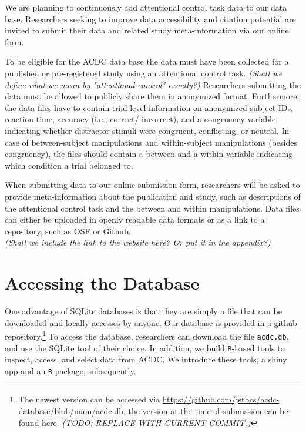 \documentclass[
  man,floatsintext]{apa6}
\begin{document}
We are planning to continuously add attentional control task data to our data base. Researchers seeking to improve data accessibility and citation potential are invited to submit their data and related study meta-information via our online form.

To be eligible for the ACDC data base the data must have been collected for a published or pre-registered study using an attentional control task. \emph{ (Shall we define what we mean by "attentional control" exactly?)} Researchers submitting the data must be allowed to publicly share them in anonymized format. Furthermore, the data files have to contain trial-level information on anonymized subject IDs, reaction time, accuracy (i.e., correct/ incorrect), and a congruency variable, indicating whether distractor stimuli were congruent, conflicting, or neutral. In case of between-subject manipulations and within-subject manipulations (besides congruency), the files should contain a between and a within variable indicating which condition a trial belonged to.

When submitting data to our online submission form, researchers will be asked to provide meta-information about the publication and study, such as descriptions of the attentional control task and the between and within manipulations. Data files can either be uploaded in openly readable data formats or as a link to a repository, such as OSF or Github.\\
\emph{ (Shall we include the link to the website here? Or put it in the appendix?)}

\hypertarget{accessing-the-database}{%
\section{Accessing the Database}\label{accessing-the-database}}

One advantage of SQLite databases is that they are simply a file that can be downloaded and locally accesses by anyone. Our database is provided in a github repository.\footnote{The newest version can be accessed via \url{https://github.com/jstbcs/acdc-database/blob/main/acdc.db}, the version at the time of submission can be found \href{https://github.com/jstbcs/acdc-database/blob/main/acdc.db}{here}. \emph{ (TODO: REPLACE WITH CURRENT COMMIT.)}} To access the database, researchers can download the file \texttt{acdc.db}, and use the SQLite tool of their choice. In addition, we build \texttt{R}-based tools to inspect, access, and select data from ACDC. We introduce these tools, a shiny app and an \texttt{R} package, subsequently.
\end{document}
